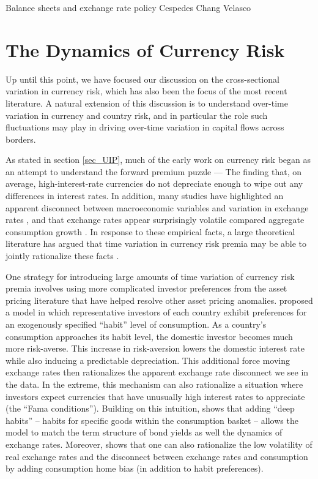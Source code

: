 \documentclass{ar-1col}
\begin{document}
Balance sheets and exchange rate policy Cespedes Chang Velasco 


\section{The Dynamics of Currency Risk\label{sec_dynamics}}

Up until this point, we have focused our discussion on the cross-sectional variation in currency risk, which has also been the focus of the most recent literature. A natural extension of this discussion is to understand over-time variation in currency and country risk, and in particular the role such fluctuations may play in driving over-time variation in capital flows across borders.

As stated in section \ref{sec_UIP}, much of the early work on currency risk began as an attempt to understand the forward premium puzzle --- The finding that, on average, high-interest-rate currencies do not depreciate enough to wipe out any differences in interest rates. In addition, many studies have highlighted an apparent disconnect between macroeconomic variables and variation in exchange rates \citep{MeeseRogoff1983}, and that exchange rates appear surprisingly volatile compared aggregate consumption growth \citep{BackusSmith1993}. In response to these empirical facts, a large theoretical literature has argued that time variation in currency risk premia may be able to jointly rationalize these facts \citep{Fama1984,Backusetal2001}.

One strategy for introducing large amounts of time variation of currency risk premia involves using more complicated investor preferences from the asset pricing literature that have helped resolve other asset pricing anomalies. \citet{Verdelhan2010} proposed a model in which representative investors of each country exhibit preferences for an exogenously specified ``habit'' level of consumption. As a country's consumption approaches its habit level, the domestic investor becomes much more risk-averse. This increase in risk-aversion lowers the domestic interest rate while also inducing a predictable depreciation. This additional force moving exchange rates then rationalizes the apparent exchange rate disconnect we see in the data. In the extreme, this mechanism can also rationalize a situation where investors expect currencies that have unusually high interest rates to appreciate (the ``Fama conditions'').  Building on this intuition, \citet{Heyerdahl-Larsen2011} shows that adding ``deep habits'' -- habits for specific goods within the consumption basket -- allows the model to match the term structure of bond yields as well the dynamics of exchange rates. Moreover, \citet{Stathopoulos2017} shows that one can also rationalize the low volatility of real exchange rates and the disconnect between exchange rates and consumption by adding consumption home bias (in addition to habit preferences). 
\end{document}

